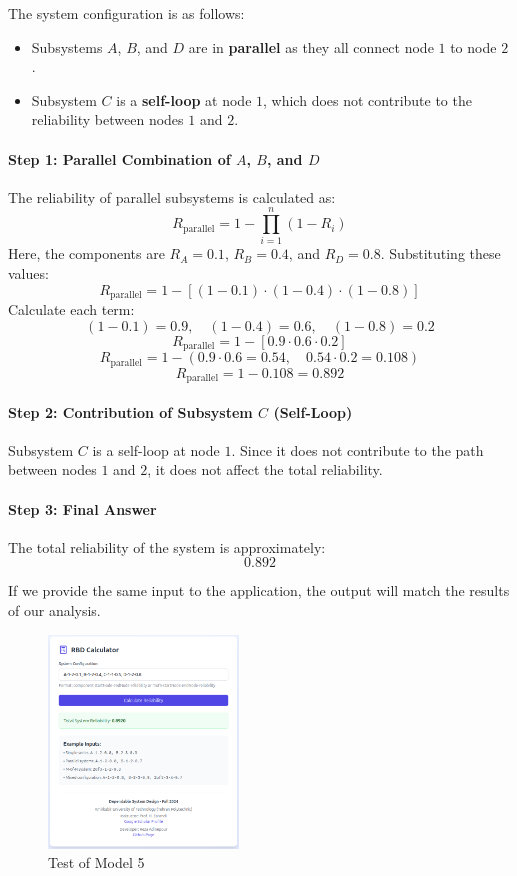 \documentclass[12pt	]{article}
\begin{document}
The system configuration is as follows:
\begin{itemize}
	\item Subsystems $A$, $B$, and $D$ are in \textbf{parallel} as they all connect node $1$ to node $2$.
	\item Subsystem $C$ is a \textbf{self-loop} at node $1$, which does not contribute to the reliability between nodes $1$ and $2$.
\end{itemize}

\paragraph{Step 1: Parallel Combination of $A$, $B$, and $D$}
The reliability of parallel subsystems is calculated as:
\[
R_{\text{parallel}} = 1 - \prod_{i=1}^n \left(1 - R_i\right)
\]
Here, the components are $R_A = 0.1$, $R_B = 0.4$, and $R_D = 0.8$. Substituting these values:
\[
R_{\text{parallel}} = 1 - \left[(1 - 0.1) \cdot (1 - 0.4) \cdot (1 - 0.8)\right]
\]
Calculate each term:
\[
(1 - 0.1) = 0.9, \quad (1 - 0.4) = 0.6, \quad (1 - 0.8) = 0.2
\]
\[
R_{\text{parallel}} = 1 - \left[0.9 \cdot 0.6 \cdot 0.2\right]
\]
\[
R_{\text{parallel}} = 1 - (0.9 \cdot 0.6 = 0.54, \quad 0.54 \cdot 0.2 = 0.108)
\]
\[
R_{\text{parallel}} = 1 - 0.108 = 0.892
\]

\paragraph{Step 2: Contribution of Subsystem $C$ (Self-Loop)}
Subsystem $C$ is a self-loop at node $1$. Since it does not contribute to the path between nodes $1$ and $2$, it does not affect the total reliability.

\paragraph{Step 3: Final Answer}
The total reliability of the system is approximately:
\[
\boxed{0.892}
\]

If we provide the same input to the application, the output will match the results of our analysis.
\newpage

\begin{figure}[h]
	\centering
	\includegraphics[width=0.45\textwidth]{Images/img7.png}
	\caption{Test of Model 5}
	\label{fig:Test of Model 5}
\end{figure}
\end{document}
